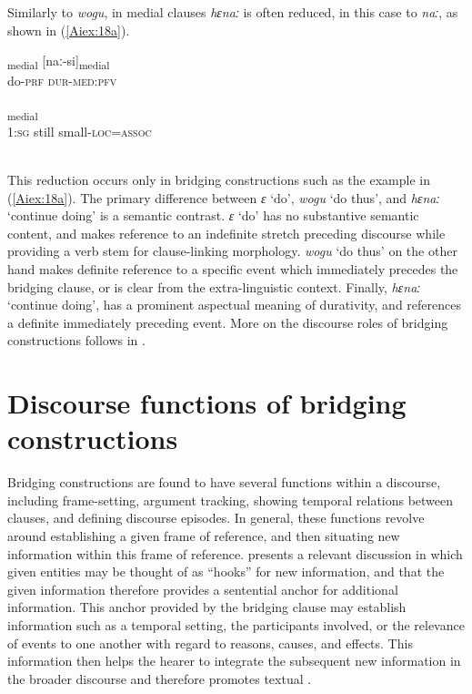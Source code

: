 \documentclass[output=paper]{LSP/langsci}
\begin{document}
Similarly to \textit{wogu}, in medial clauses \textit{hɛnaː} is often reduced, in this case to \textit{naː}, as shown in (\ref{Aiex:18a}).

\begin{exe}
\ex \label{Aiex:18ab}
\begin{xlist}
\ex \label{Aiex:18a}
\gll [ɛ-ɸɛija]\textsubscript{medial}	[naː-si]\textsubscript{medial}\\
do-\textsc{prf}	\textsc{dur-med:pfv}\\
\glt {}\\
\ex \label{Aiex:18b}
\gll [nɛ	ɛna	hodosu-wɛ=mi]\textsubscript{medial}\\
\textsc{1:sg}	still	small\textsc{-loc=assoc}\\
\glt {}\\
\end{xlist}
\end{exe}

This reduction occurs only in bridging constructions such as the example in (\ref{Aiex:18a}). The primary difference between \textit{ɛ} ‘do’, \textit{wogu} ‘do thus’, and \textit{hɛnaː} ‘continue doing’ is a semantic contrast. \textit{ɛ} ‘do’ has no substantive semantic content, and makes reference to an indefinite stretch preceding discourse while providing a verb stem for clause-linking morphology. \textit{wogu} ‘do thus’ on the other hand makes definite reference to a specific event which immediately precedes the bridging clause, or is clear from the extra-linguistic context. Finally, \textit{hɛnaː} ‘continue doing’, has a prominent aspectual meaning of durativity, and references a definite immediately preceding event. More on the discourse roles of bridging constructions follows in .

\section{Discourse functions of bridging constructions} 
\label{AiDiscourse}
Bridging constructions are found to have several functions within a discourse, including frame-setting, argument tracking, showing temporal relations between clauses, and defining discourse episodes. In general, these functions revolve around establishing a given frame of reference, and then situating new information within this frame of reference. \citet{prince81} presents a relevant discussion in which given entities may be thought of as ``hooks'' for new information, and that the given information therefore provides a sentential anchor for additional information. This anchor provided by the bridging clause may establish information such as a temporal setting, the participants involved, or the relevance of events to one another with regard to reasons, causes, and effects. This information then helps the hearer to integrate the subsequent new information in the broader discourse and therefore promotes textual .
\end{document}
